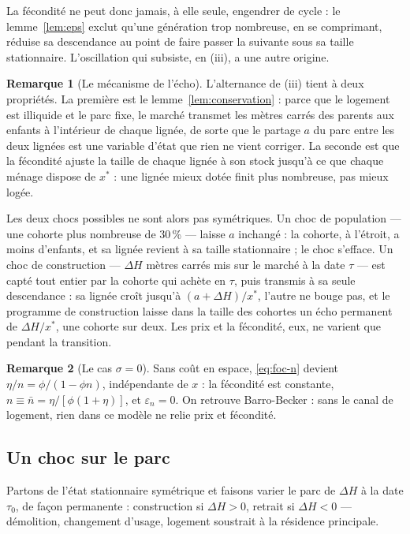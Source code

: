 \documentclass[11pt,a4paper]{article}
\theoremstyle{plain}
\theoremstyle{definition}
\newtheorem{remarque}{Remarque}
\newcommand{\eps}{\varepsilon}
\begin{document}
La fécondité ne peut donc jamais, à elle seule, engendrer de cycle : le lemme~\ref{lem:eps} exclut qu'une génération trop nombreuse, en se comprimant, réduise sa descendance au point de faire passer la suivante sous sa taille stationnaire. L'oscillation qui subsiste, en (iii), a une autre origine.

\begin{remarque}[Le mécanisme de l'écho]\label{rem:echo}
L'alternance de (iii) tient à deux propriétés. La première est le lemme~\ref{lem:conservation} : parce que le logement est illiquide et le parc fixe, le marché transmet les mètres carrés des parents aux enfants à l'intérieur de chaque lignée, de sorte que le partage $a$ du parc entre les deux lignées est une variable d'état que rien ne vient corriger. La seconde est que la fécondité ajuste la taille de chaque lignée à son stock jusqu'à ce que chaque ménage dispose de $x^*$ : une lignée mieux dotée finit plus nombreuse, pas mieux logée.

Les deux chocs possibles ne sont alors pas symétriques. Un choc de population — une cohorte plus nombreuse de 30\,\% — laisse $a$ inchangé : la cohorte, à l'étroit, a moins d'enfants, et sa lignée revient à sa taille stationnaire ; le choc s'efface. Un choc de construction — $\Delta H$ mètres carrés mis sur le marché à la date $\tau$ — est capté tout entier par la cohorte qui achète en $\tau$, puis transmis à sa seule descendance : sa lignée croît jusqu'à $(a+\Delta H)/x^*$, l'autre ne bouge pas, et le programme de construction laisse dans la taille des cohortes un écho permanent de $\Delta H/x^*$, une cohorte sur deux. Les prix et la fécondité, eux, ne varient que pendant la transition.
\end{remarque}

\begin{remarque}[Le cas $\sigma = 0$]
Sans coût en espace, \eqref{eq:foc-n} devient $\eta/n = \phi/(1-\phi n)$, indépendante de $x$ : la fécondité est constante, $n \equiv \bar n = \eta/[\phi(1+\eta)]$, et $\eps_n = 0$. On retrouve Barro-Becker : sans le canal de logement, rien dans ce modèle ne relie prix et fécondité.
\end{remarque}

\subsection{Un choc sur le parc}\label{sec:choc}

Partons de l'état stationnaire symétrique et faisons varier le parc de $\Delta H$ à la date $\tau_0$, de façon permanente : construction si $\Delta H > 0$, retrait si $\Delta H < 0$ — démolition, changement d'usage, logement soustrait à la résidence principale.
\end{document}
